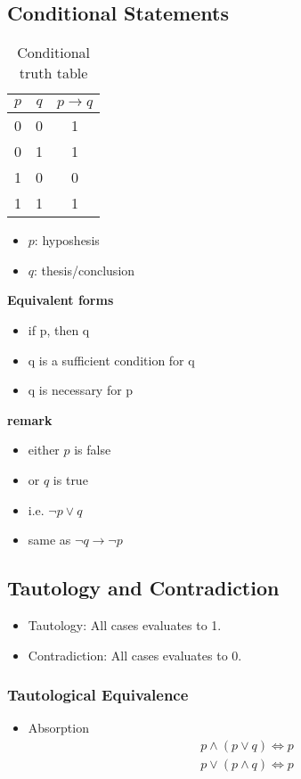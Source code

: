 \documentclass{article}
\theoremstyle{definition}
\begin{document}
\subsection{Conditional Statements}
\begin{table}[h]
    \centering
    \caption{Conditional truth table}

    \begin{tabular}{|c|c|c|}
        \hline  $p$   &   $q$   &   $p \rightarrow q$   \\
        \hline  0   &   0   &   1   \\
        \hline  0   &   1   &   1   \\
        \hline  1   &   0   &   0   \\
        \hline  1   &   1   &   1   \\
        \hline
    \end{tabular}
\end{table}
\begin{itemize}
    \item $p$: hyposhesis
    \item $q$: thesis/conclusion
\end{itemize}
\textbf{Equivalent forms}
\begin{itemize}
    \item if p, then q
    \item q is a sufficient condition for q
    \item q is necessary for p
\end{itemize}
\textbf{remark}
\begin{itemize}
    \item either $p$ is false
    \item or $q$ is true
    \item i.e. $\neg p \lor q$
    \item same as $\neg q \rightarrow \neg p$
\end{itemize}
\subsection{Tautology and Contradiction}
\begin{itemize}
    \item Tautology: All cases evaluates to 1.
    \item Contradiction: All cases evaluates to 0.
\end{itemize}
\subsubsection{Tautological Equivalence}
\begin{itemize}
    \item Absorption
        \begin{align*}
            &   p \land (p \lor q) \Leftrightarrow p    \\
            &   p \lor (p \land q) \Leftrightarrow p
        \end{align*}
\end{itemize}
\end{document}
